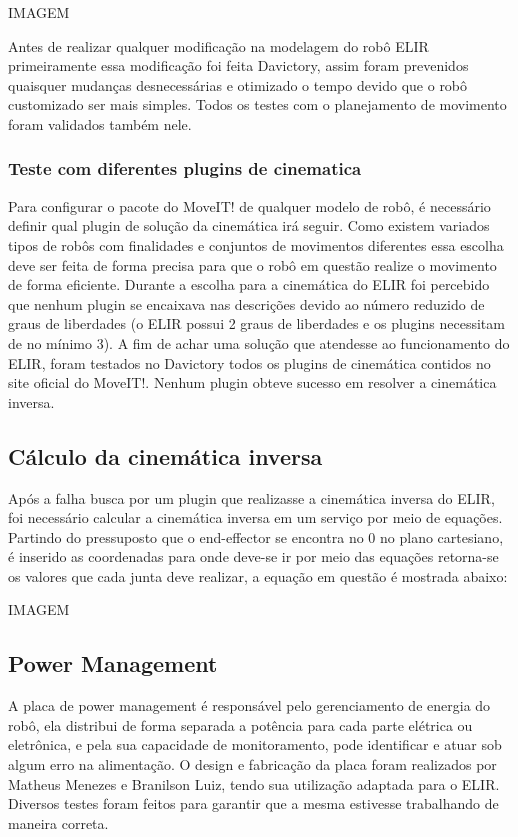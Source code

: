 IMAGEM

Antes de realizar qualquer modificação na modelagem do robô ELIR primeiramente essa modificação foi feita Davictory, assim foram prevenidos quaisquer mudanças desnecessárias e otimizado o tempo devido que o robô customizado ser mais simples. Todos os testes com o planejamento de movimento foram validados também nele.


\subsubsection{Teste com diferentes plugins de cinematica}
Para configurar o pacote do MoveIT! de qualquer modelo de robô, é necessário definir qual plugin de solução da cinemática irá seguir. Como existem variados tipos de robôs com finalidades e conjuntos de movimentos diferentes essa escolha deve ser feita de forma precisa para que o robô em questão realize o movimento de forma eficiente.
Durante a escolha para a cinemática do ELIR foi percebido que nenhum plugin se encaixava nas descrições devido ao número reduzido de graus de liberdades (o ELIR possui 2 graus de liberdades e os plugins necessitam de no mínimo 3). A fim de achar uma solução que atendesse ao funcionamento do ELIR, foram testados no Davictory todos os plugins de cinemática contidos no site oficial do MoveIT!. Nenhum plugin obteve sucesso em resolver a cinemática inversa.


\subsection{Cálculo da cinemática inversa}
Após a falha busca por um plugin que realizasse a cinemática inversa do ELIR, foi necessário calcular a cinemática inversa em um serviço por meio de equações. Partindo do pressuposto que o end-effector se encontra no 0 no plano cartesiano, é inserido as coordenadas para onde deve-se ir por meio das equações retorna-se os valores que cada junta deve realizar, a equação em questão é mostrada abaixo:

IMAGEM

\subsection{Power Management}
A placa de power management é responsável pelo gerenciamento de energia do robô, ela distribui de forma separada a potência para cada parte elétrica ou eletrônica, e pela sua capacidade de monitoramento, pode identificar e atuar sob algum erro na alimentação. O design e fabricação da placa foram realizados por Matheus Menezes e Branilson Luiz, tendo sua utilização adaptada para o ELIR. Diversos testes foram feitos para garantir que a mesma estivesse trabalhando de maneira correta.

